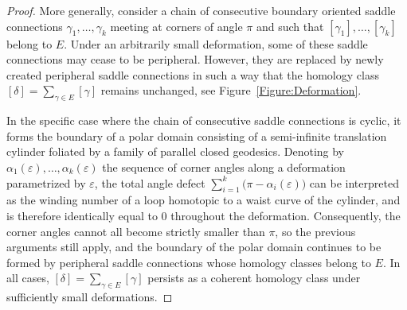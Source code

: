 \documentclass[10pt,a4paper]{amsart}
\begin{document}
\begin{proof}
\par
More generally, consider a chain of consecutive boundary oriented saddle connections $\gamma_{1},\dots,\gamma_{k}$ meeting at corners of angle $\pi$ and such that $[\gamma_{1}],\dots,[\gamma_{k}]$ belong to $E$. Under an arbitrarily small deformation, some of these saddle connections may cease to be peripheral. However, they are replaced by newly created peripheral saddle connections in such a way that the homology class $[\delta]=\sum\limits_{\gamma \in E} [\gamma]$ remains unchanged, see Figure~\ref{Figure:Deformation}.
\par
In the specific case where the chain of consecutive saddle connections is cyclic, it forms the boundary of a polar domain consisting of a semi-infinite translation cylinder foliated by a family of parallel closed geodesics. Denoting by $\alpha_{1}(\varepsilon),\dots,\alpha_{k}(\varepsilon)$ the sequence of corner angles along a deformation parametrized by $\varepsilon$, the total angle defect
$
\sum\limits_{i=1}^{k}\bigl(\pi-\alpha_i(\varepsilon)\bigr)
$
can be interpreted as the winding number of a loop homotopic to a waist curve of the cylinder, and is therefore identically equal to $0$ throughout the deformation. Consequently, the corner angles cannot all become strictly smaller than $\pi$, so the previous arguments still apply, and the boundary of the polar domain continues to be formed by peripheral saddle connections whose homology classes belong to $E$.
 In all cases,
$
[\delta]=\sum_{\gamma\in E}[\gamma]
$
persists as a coherent homology class under sufficiently small deformations.
\end{proof}
\end{document}
